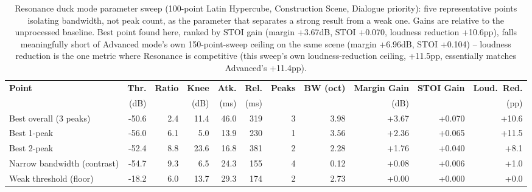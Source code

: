 \begin{table}[h]
\centering
\tiny
\caption{Resonance duck mode parameter sweep (100-point Latin Hypercube,
Construction Scene, Dialogue priority): five representative points
isolating bandwidth, not peak count, as the parameter that separates a
strong result from a weak one. Gains are relative to the unprocessed
baseline. Best point found here, ranked by STOI gain (margin +3.67dB,
STOI +0.070, loudness reduction +10.6pp), falls meaningfully short of
Advanced mode's own 150-point-sweep ceiling on the same scene (margin
+6.96dB, STOI +0.104) -- loudness reduction is the one metric where
Resonance is competitive (this sweep's own loudness-reduction ceiling,
+11.5pp, essentially matches Advanced's +11.4pp).}
\label{tab:resonance-sweep}
\begin{tabular}{@{}l r r r r r r r r r r@{}}
\toprule
\cellcolor{paramgrey}\textbf{Point} & \cellcolor{paramgrey}\textbf{Thr.} & \cellcolor{paramgrey}\textbf{Ratio} & \cellcolor{paramgrey}\textbf{Knee} & \cellcolor{paramgrey}\textbf{Atk.} & \cellcolor{paramgrey}\textbf{Rel.} & \cellcolor{paramgrey}\textbf{Peaks} & \cellcolor{paramgrey}\textbf{BW (oct)} & \textbf{Margin Gain} & \textbf{STOI Gain} & \textbf{Loud.\ Red.} \\
 & \cellcolor{paramgrey}(dB) & \cellcolor{paramgrey}{} & \cellcolor{paramgrey}(dB) & \cellcolor{paramgrey}(ms) & \cellcolor{paramgrey}(ms) & \cellcolor{paramgrey}{} & \cellcolor{paramgrey}{} & (dB) & & (pp) \\
\midrule
Best overall (3 peaks)   & -50.6 & 2.4 & 11.4 & 46.0 & 319 & 3 & 3.98 & \cellcolor{green!70}+3.67 & \cellcolor{yellow!70}+0.070 & \cellcolor{orange!66}+10.6 \\
Best 1-peak              & -56.0 & 6.1 & 5.0  & 13.9 & 230 & 1 & 3.56 & \cellcolor{green!50}+2.36 & \cellcolor{yellow!66}+0.065 & \cellcolor{orange!70}+11.5 \\
Best 2-peak              & -52.4 & 8.8 & 23.6 & 16.8 & 381 & 2 & 2.28 & \cellcolor{green!41}+1.76 & \cellcolor{yellow!46}+0.040 & \cellcolor{orange!54}+8.1  \\
Narrow bandwidth (contrast) & -54.7 & 9.3 & 6.5  & 24.3 & 155 & 4 & 0.12 & \cellcolor{green!16}+0.08 & \cellcolor{yellow!20}+0.006 & \cellcolor{orange!20}+1.0  \\
Weak threshold (floor)   & -18.2 & 6.0 & 13.7 & 29.3 & 174 & 2 & 2.73 & \cellcolor{green!15}+0.00 & \cellcolor{yellow!15}+0.000 & \cellcolor{orange!15}+0.0  \\
\bottomrule
\end{tabular}

\end{table}
